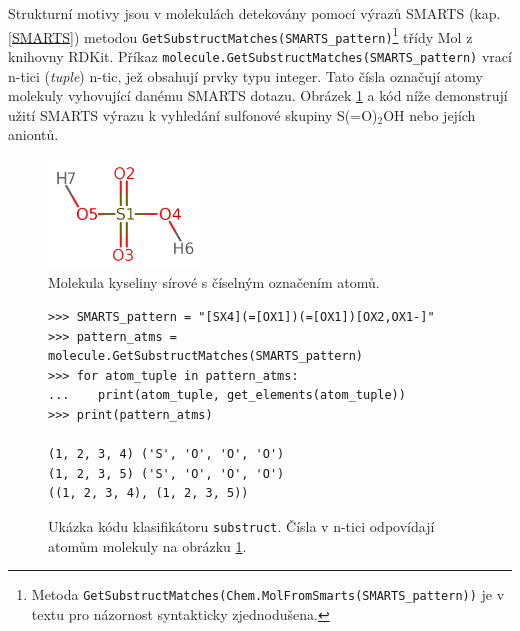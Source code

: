 Strukturní motivy jsou v molekulách detekovány pomocí výrazů SMARTS (kap. \ref{SMARTS}) metodou  \verb|GetSubstructMatches(SMARTS_pattern)|\footnote{Metoda  \texttt{GetSubstructMatches(Chem.MolFromSmarts(SMARTS\_pattern))} je v textu pro názornost syntakticky zjednodušena.} třídy Mol z kni\-hovny RDKit. 
Příkaz \verb|molecule.GetSubstructMatches(SMARTS_pattern)| 
vrací n-tici (\textit{tuple}) n-tic, jež obsahují prvky typu integer. Tato čísla označují atomy molekuly vyhovující danému SMARTS dotazu. Obrázek \ref{h2so5} a kód níže demonstrují užití SMARTS výrazu k vyhledání sulfonové skupiny S(=O)$_2$OH nebo jejích aniontů.

\begin{figure}[h]
    \centering
    \includegraphics[width=4cm]{pictures/sirovka.png}
    \caption{Molekula kyseliny sírové s číselným označením atomů.}
    \label{h2so5}
\end{figure}



\begin{figure}[H]
\begin{lstlisting}
>>> SMARTS_pattern = "[SX4](=[OX1])(=[OX1])[OX2,OX1-]"
>>> pattern_atms = molecule.GetSubstructMatches(SMARTS_pattern)
>>> for atom_tuple in pattern_atms:
...    print(atom_tuple, get_elements(atom_tuple))
>>> print(pattern_atms)

(1, 2, 3, 4) ('S', 'O', 'O', 'O')
(1, 2, 3, 5) ('S', 'O', 'O', 'O')
((1, 2, 3, 4), (1, 2, 3, 5))
\end{lstlisting}
\caption{Ukázka kódu klasifikátoru \texttt{substruct}. Čísla v n-tici odpovídají atomům molekuly na obrázku \ref{h2so5}.     }
\end{figure}

